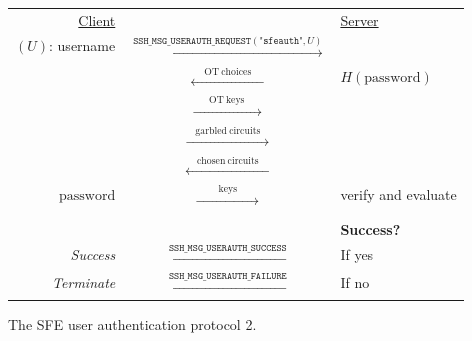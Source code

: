 \begin{figure*}[t]
  \centering

  \begin{tabular}{|rcl|}
    \hline
    \underline{Client} & & \underline{Server} \\
    $(U)$: username &
    $\xrightarrow{\mathrm{\texttt{SSH\_MSG\_USERAUTH\_REQUEST}}(\texttt{"sfeauth"},U)}$ & \\
    & $\xleftarrow{\mathrm{~~~~~~OT~choices~~~~~~}}$ & $H(\mathrm{password})$ \\
    & $\xrightarrow{\mathrm{~~~~~~~OT~keys~~~~~~~~}}$ & \\
    & $\xrightarrow{\mathrm{~~~~garbled~circuits~~~~}}$ & \\
    & $\xleftarrow{\mathrm{~~~~~chosen~circuits~~~~~}}$ & \\
    $\mathrm{password}$ & $\xrightarrow{\mathrm{~~~~~~~~~~keys~~~~~~~~~~}}$ & verify and evaluate \\
    & & \\
    & & \textbf{Success?} \\
    \textit{Success} & $\xleftarrow{\mathrm{\texttt{SSH\_MSG\_USERAUTH\_SUCCESS}}}$ & If yes \\
    \textit{Terminate} & $\xleftarrow{\mathrm{\texttt{SSH\_MSG\_USERAUTH\_FAILURE}}}$ &
    If no \\
    \hline
  \end{tabular}

  \caption{The SFE user authentication protocol 2.}
  \label{fig:sfeauth}
  \vspace{-1.5em}
\end{figure*}
